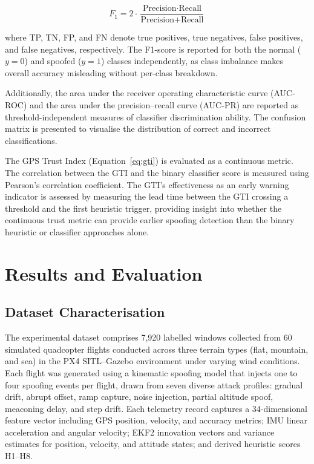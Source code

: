 \documentclass[electronics,article,accept,moreauthors]{Definitions/mdpi}
\begin{document}
\begin{equation}
F_1 = 2 \cdot \frac{\text{Precision} \cdot \text{Recall}}{\text{Precision} + \text{Recall}}
\label{eq:f1}
\end{equation}

where TP, TN, FP, and FN denote true positives, true negatives, false positives, and false negatives, respectively. The F1-score is reported for both the normal ($y = 0$) and spoofed ($y = 1$) classes independently, as class imbalance makes overall accuracy misleading without per-class breakdown.

Additionally, the area under the receiver operating characteristic curve (AUC-ROC) and the area under the precision--recall curve (AUC-PR) are reported as threshold-independent measures of classifier discrimination ability. The confusion matrix is presented to visualise the distribution of correct and incorrect classifications.

The GPS Trust Index (Equation~\ref{eq:gti}) is evaluated as a continuous metric. The correlation between the GTI and the binary classifier score is measured using Pearson's correlation coefficient. The GTI's effectiveness as an early warning indicator is assessed by measuring the lead time between the GTI crossing a threshold and the first heuristic trigger, providing insight into whether the continuous trust metric can provide earlier spoofing detection than the binary heuristic or classifier approaches alone.



\section{Results and Evaluation}
\label{sec:results}

\subsection{Dataset Characterisation}

The experimental dataset comprises 7,920 labelled windows collected from 60 simulated quadcopter flights conducted across three terrain types (flat, mountain, and sea) in the PX4 SITL--Gazebo environment under varying wind conditions. Each flight was generated using a kinematic spoofing model that injects one to four spoofing events per flight, drawn from seven diverse attack profiles: gradual drift, abrupt offset, ramp capture, noise injection, partial altitude spoof, meaconing delay, and step drift. Each telemetry record captures a 34-dimensional feature vector including GPS position, velocity, and accuracy metrics; IMU linear acceleration and angular velocity; EKF2 innovation vectors and variance estimates for position, velocity, and attitude states; and derived heuristic scores H1--H8.
\end{document}
